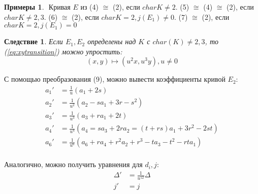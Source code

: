 \documentclass[12pt]{article}
\newtheorem{corollary}[theorem]{Следствие}
\theoremstyle{definition}
\theoremstyle{definition}
\newtheorem{examples}[theorem]{Примеры}
\theoremstyle{definition}
\begin{document}
            \begin{examples} $ $\newline
                Кривая $E$ из (4) $\cong$ (2), если $char K \neq 2$.\newline
                (5) $\cong$ (4) $\cong$ (2), если $char K \neq 2,3$.\newline
                (6) $\cong$ (2), если $char K = 2, j(E_1)\neq0$.\newline
                (7) $\cong$ (2), если $char K = 2, j(E_1)=0$
            \end{examples}
            
            \begin{corollary}
            \label{cor3}
                Если $E_1, E_2$ определены над $K$ с $char(K) \neq 2,3$, то (\ref{eq:xytransition}) можно упростить:
                \[
                    (x,y) \mapsto (u^2x, u^3y), u \neq 0
                \]
            \end{corollary}
            
            С помощью преобразования (9), можно вывести коэффициенты кривой $E_2$:
            \begin{align}
            \label{eq:e2transition}
                a_1' &= \frac{1}{u}(a_1+2s) \\  \nonumber
                a_2' &= \frac{1}{u^2}(a_2-sa_1+3r-s^2) \\ \nonumber
                a_3' &= \frac{1}{u^3}(a_3+ra_1+2t) \\ \nonumber
                a_4' &= \frac{1}{u^4}(a_4 = sa_3 + 2ra_2 = (t+rs)a_1 + 3r^2 - 2st) \\ \nonumber
                a_6' &= \frac{1}{u^6}(a_6 + ra_4 + r^2a_2 + r^3 - ta_3 - t^2 - rta_1) \\ \nonumber
            \end{align}
            
            Аналогично, можно получить уравнения для $d_i, j$:
            \begin{align*}
                \Delta' &= \frac{1}{u^{12}}\Delta \\
                j' &= j
            \end{align*}
            
\end{document}
